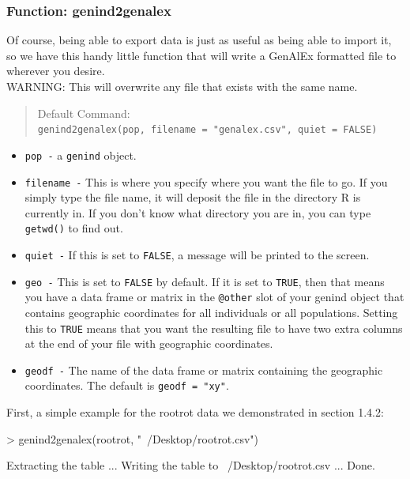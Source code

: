 \documentclass[letterpaper]{article}
\newcommand{\tab}{\hspace*{1em}}
\begin{document}
\subsubsection{Function: genind2genalex}\label{intro:import:genind2genalex}

\tab\tab Of course, being able to export data is just as useful as being able to import it, so we have this handy little function that will write a GenAlEx formatted file to wherever you desire.\\ 
WARNING: This will overwrite any file that exists with the same name.
\begin{quote}
Default Command:\\
\texttt{genind2genalex(pop, filename = "genalex.csv", quiet = FALSE)}
\end{quote}
\begin{itemize}
  \item \texttt{pop -} a \texttt{genind} object.
  \item \texttt{filename -} This is where you specify where you want the file to go. If you simply type the file name, it will deposit the file in the directory R is currently in. If you don't know what directory you are in, you can type \texttt{getwd()} to find out.
  \item \texttt{quiet -} If this is set to \texttt{FALSE}, a message will be printed to the screen.
  \item \texttt{geo -} This is set to \texttt{FALSE} by default. If it is set to \texttt{TRUE}, then that means you have a data frame or matrix in the \texttt{@other} slot of your genind object that contains geographic coordinates for all individuals or all populations. Setting this to \texttt{TRUE} means that you want the resulting file to have two extra columns at the end of your file with geographic coordinates.
  \item \texttt{geodf -} The name of the data frame or matrix containing the geographic coordinates. The default is \texttt{geodf = "xy"}.
\end{itemize}

First, a simple example for the rootrot data we demonstrated in section 1.4.2:
\begin{Schunk}
\begin{Sinput}
> genind2genalex(rootrot, "~/Desktop/rootrot.csv")
\end{Sinput}
\end{Schunk}
\begin{Schunk}
\begin{Soutput}
Extracting the table ... Writing the table to ~/Desktop/rootrot.csv ... Done.
\end{Soutput}
\end{Schunk}
\end{document}
